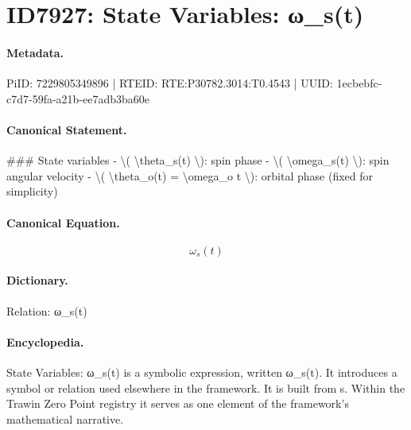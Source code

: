 \section*{ID7927: State Variables: ω\_s(t)}
\paragraph{Metadata.}
PiID: 7229805349896 | RTEID: RTE:P30782.3014:T0.4543 | UUID: 1ecbebfc-c7d7-59fa-a21b-ee7adb3ba60e

\paragraph{Canonical Statement.}
\#\#\# State variables - \textbackslash{}( \textbackslash{}theta\_s(t) \textbackslash{}): spin phase - \textbackslash{}( \textbackslash{}omega\_s(t) \textbackslash{}): spin angular velocity - \textbackslash{}( \textbackslash{}theta\_o(t) = \textbackslash{}omega\_o t \textbackslash{}): orbital phase (fixed for simplicity)

\paragraph{Canonical Equation.}
\[
\omega_s(t)
\]

\paragraph{Dictionary.}
Relation: ω\_s(t)

\paragraph{Encyclopedia.}
State Variables: ω\_s(t) is a symbolic expression, written ω\_s(t). It introduces a symbol or relation used elsewhere in the framework. It is built from s. Within the Trawin Zero Point registry it serves as one element of the framework's mathematical narrative.
